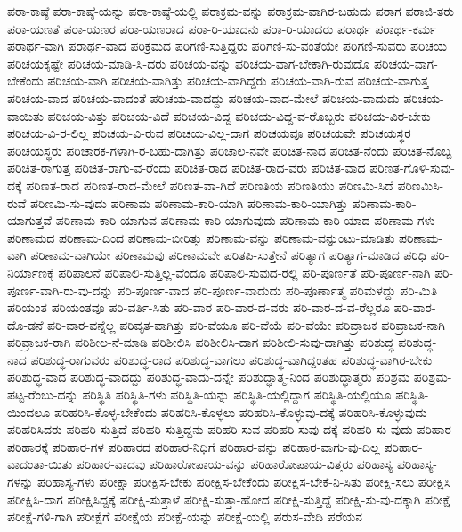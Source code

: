 {ಪರಾ-ಕಾಷ್ಠೆ
ಪರಾ-ಕಾಷ್ಠೆ-ಯನ್ನು
ಪರಾ-ಕಾಷ್ಠೆ-ಯಲ್ಲಿ
ಪರಾಕ್ರಮ-ವನ್ನು
ಪರಾಕ್ರಮ-ವಾಗಿರ-ಬಹುದು
ಪರಾಗ
ಪರಾಜಿ-ತರು
ಪರಾ-ಯಣತೆ
ಪರಾ-ಯಣರ
ಪರಾ-ಯಣರಾದ
ಪರಾ-ರಿ-ಯಾದನು
ಪರಾ-ರಿ-ಯಾದರು
ಪರಾರ್ಥ
ಪರಾರ್ಥ-ಕರ್ಮ
ಪರಾರ್ಥ-ವಾಗಿ
ಪರಾರ್ಥ-ವಾದ
ಪರಿಕ್ರಮದ
ಪರಿಗಣಿ-ಸುತ್ತಿದ್ದರು
ಪರಿಗಣಿ-ಸು-ವಂತೆಯೇ
ಪರಿಗಣಿ-ಸುವರು
ಪರಿಚಯ
ಪರಿಚಯಕ್ಕಷ್ಟೇ
ಪರಿಚಯ-ಮಾಡಿ-ಸಿ-ದರು
ಪರಿಚಯ-ವನ್ನು
ಪರಿಚಯ-ವಾಗ-ಬೇಕಾಗಿ-ರುವುದೊ
ಪರಿಚಯ-ವಾಗ-ಬೇಕೆಂದು
ಪರಿಚಯ-ವಾಗಿ
ಪರಿಚಯ-ವಾಗಿತ್ತು
ಪರಿಚಯ-ವಾಗಿದ್ದರು
ಪರಿಚಯ-ವಾಗಿ-ರುವ
ಪರಿಚಯ-ವಾಗುತ್ತ
ಪರಿಚಯ-ವಾದ
ಪರಿಚಯ-ವಾದಂತೆ
ಪರಿಚಯ-ವಾದದ್ದು
ಪರಿಚಯ-ವಾದ-ಮೇಲೆ
ಪರಿಚಯ-ವಾದುದು
ಪರಿಚಯ-ವಾಯಿತು
ಪರಿಚಯ-ವಿತ್ತು
ಪರಿಚಯ-ವಿದೆ
ಪರಿಚಯ-ವಿದ್ದ
ಪರಿಚಯ-ವಿದ್ದ-ವ-ರೊಬ್ಬರು
ಪರಿಚಯ-ವಿರ-ಬೇಕು
ಪರಿಚಯ-ವಿ-ರ-ಲಿಲ್ಲ
ಪರಿಚಯ-ವಿ-ರುವ
ಪರಿಚಯ-ವಿಲ್ಲ-ದಾಗ
ಪರಿಚಯವೂ
ಪರಿಚಯವೇ
ಪರಿಚಯಸ್ಥರ
ಪರಿಚಯಸ್ಥರು
ಪರಿಚಾರಕ-ಗಳಾಗಿ-ರ-ಬಹು-ದಾಗಿತ್ತು
ಪರಿಚಾಲ-ನವೇ
ಪರಿಚಿತ-ನಾದ
ಪರಿಚಿತ-ನೆಂದು
ಪರಿಚಿತ-ನೊಬ್ಬ
ಪರಿಚಿತ-ರಾಗುತ್ತ
ಪರಿಚಿತ-ರಾಗು-ವ-ರೆಂದು
ಪರಿಚಿತ-ರಾದ
ಪರಿಚಿತ-ರಾದ-ವರು
ಪರಿಚಿತ-ವಾದ
ಪರಿಣತ-ಗೊಳಿ-ಸುವು-ದಕ್ಕೆ
ಪರಿಣತ-ರಾದ
ಪರಿಣತ-ರಾದ-ಮೇಲೆ
ಪರಿಣತ-ವಾ-ಗಿದೆ
ಪರಿಣತಿಯ
ಪರಿಣತಿಯು
ಪರಿಣಮಿ-ಸಿದೆ
ಪರಿಣಮಿಸಿ-ರುವೆ
ಪರಿಣಮಿ-ಸು-ವುದು
ಪರಿಣಾಮ
ಪರಿಣಾಮ-ಕಾರಿ-ಯಾಗಿ
ಪರಿಣಾಮ-ಕಾರಿ-ಯಾಗಿತ್ತು
ಪರಿಣಾಮ-ಕಾರಿ-ಯಾಗುತ್ತವೆ
ಪರಿಣಾಮ-ಕಾರಿ-ಯಾಗುವ
ಪರಿಣಾಮ-ಕಾರಿ-ಯಾಗುವುದು
ಪರಿಣಾಮ-ಕಾರಿ-ಯಾದ
ಪರಿಣಾಮ-ಗಳು
ಪರಿಣಾಮದ
ಪರಿಣಾಮ-ದಿಂದ
ಪರಿಣಾಮ-ಬೀರಿತ್ತು
ಪರಿಣಾಮ-ವನ್ನು
ಪರಿಣಾಮ-ವನ್ನುಂಟು-ಮಾಡಿತು
ಪರಿಣಾಮ-ವಾಗಿ
ಪರಿಣಾಮ-ವಾಗಿಯೇ
ಪರಿಣಾಮವು
ಪರಿಣಾಮವೇ
ಪರಿತಪಿ-ಸುತ್ತೇನೆ
ಪರಿತ್ಯಾಗ
ಪರಿತ್ಯಾಗ-ಮಾಡಿದ
ಪರಿಧಿ
ಪರಿ-ನಿರ್ಯಾಣಕ್ಕೆ
ಪರಿಪಾಲನೆ
ಪರಿಪಾಲಿ-ಸುತ್ತಿಲ್ಲ-ವೆಂದೂ
ಪರಿಪಾಲಿ-ಸುವುದ-ರಲ್ಲಿ
ಪರಿ-ಪೂರ್ಣತೆ
ಪರಿ-ಪೂರ್ಣ-ನಾಗಿ
ಪರಿ-ಪೂರ್ಣ-ವಾಗಿ-ರು-ವು-ದನ್ನು
ಪರಿ-ಪೂರ್ಣ-ವಾದ
ಪರಿ-ಪೂರ್ಣ-ವಾದುದು
ಪರಿ-ಪೂರ್ಣಾತ್ಮ
ಪರಿಮಳದ್ದು
ಪರಿ-ಮಿತಿ
ಪರಿಯಂತ
ಪರಿಯಂತವೂ
ಪರಿ-ವರ್ತಿ-ಸಿತು
ಪರಿ-ವಾರ
ಪರಿ-ವಾರ-ದ-ವರು
ಪರಿ-ವಾರ-ದ-ವ-ರೆಲ್ಲರೂ
ಪರಿ-ವಾರ-ದೊ-ಡನೆ
ಪರಿ-ವಾರ-ವನ್ನೆಲ್ಲ
ಪರಿವೃತ-ವಾಗಿತ್ತು
ಪರಿ-ವೆಯೂ
ಪರಿ-ವೆಯೆ
ಪರಿ-ವೆಯೇ
ಪರಿವ್ರಾಜಕ
ಪರಿವ್ರಾಜಕ-ನಾಗಿ
ಪರಿವ್ರಾಜಕ-ರಾಗಿ
ಪರಿಶೀಲ-ನೆ-ಮಾಡಿ
ಪರಿಶೀಲಿಸಿ
ಪರಿಶೀಲಿಸಿ-ದಾಗ
ಪರಿಶೀಲಿ-ಸುವು-ದಾಗಿತ್ತು
ಪರಿಶುದ್ಧ
ಪರಿಶುದ್ಧ-ನಾದ
ಪರಿಶುದ್ಧ-ರಾಗುವರು
ಪರಿಶುದ್ಧ-ರಾದ
ಪರಿಶುದ್ಧ-ವಾಗಲು
ಪರಿಶುದ್ಧ-ವಾಗಿದ್ದಂತಹ
ಪರಿಶುದ್ಧ-ವಾಗಿರ-ಬೇಕು
ಪರಿಶುದ್ಧ-ವಾದ
ಪರಿಶುದ್ಧ-ವಾದದ್ದು
ಪರಿಶುದ್ಧ-ವಾದು-ದನ್ನೇ
ಪರಿಶುದ್ಧಾತ್ಮ-ನಿಂದ
ಪರಿಶುದ್ಧಾತ್ಮರು
ಪರಿಶ್ರಮ
ಪರಿಶ್ರಮ-ಪಟ್ಟ-ರೆಂಬು-ದನ್ನು
ಪರಿಸ್ಥಿತಿ
ಪರಿಸ್ಥಿತಿ-ಗಳು
ಪರಿಸ್ಥಿತಿ-ಯನ್ನು
ಪರಿಸ್ಥಿತಿ-ಯಲ್ಲಿದ್ದಾಗ
ಪರಿಸ್ಥಿತಿ-ಯಲ್ಲಿಯೂ
ಪರಿಸ್ಥಿತಿ-ಯಿಂದಲೂ
ಪರಿಹರಿಸಿ-ಕೊಳ್ಳ-ಬೇಕೆಂದು
ಪರಿಹರಿಸಿ-ಕೊಳ್ಳಲು
ಪರಿಹರಿಸಿ-ಕೊಳ್ಳುವು-ದಕ್ಕೆ
ಪರಿಹರಿಸಿ-ಕೊಳ್ಳುವುದು
ಪರಿಹರಿಸಿದರು
ಪರಿಹರಿ-ಸುತ್ತಿದೆ
ಪರಿಹರಿ-ಸುತ್ತಿದ್ದನು
ಪರಿಹರಿ-ಸುವ
ಪರಿಹರಿ-ಸುವು-ದಕ್ಕೆ
ಪರಿಹರಿ-ಸು-ವುದು
ಪರಿಹಾರ
ಪರಿಹಾರಕ್ಕೆ
ಪರಿಹಾರ-ಗಳ
ಪರಿಹಾರದ
ಪರಿಹಾರ-ನಿಧಿಗೆ
ಪರಿಹಾರ-ವನ್ನು
ಪರಿಹಾರ-ವಾಗು-ವು-ದಿಲ್ಲ
ಪರಿಹಾರ-ವಾದಂತಾ-ಯಿತು
ಪರಿಹಾರ-ವಾದವು
ಪರಿಹಾರೋಪಾಯ-ವನ್ನು
ಪರಿಹಾರೋಪಾಯ-ವಿತ್ತರು
ಪರಿಹಾಸ್ಯ
ಪರಿಹಾಸ್ಯ-ಗಳನ್ನು
ಪರಿಹಾಸ್ಯ-ಗಳು
ಪರೀಕ್ಷಾ
ಪರೀಕ್ಷಿಸ-ಬೇಕು
ಪರೀಕ್ಷಿಸ-ಬೇಕೆಂದು
ಪರೀಕ್ಷಿಸ-ಬೇಕೆ-ನಿ-ಸಿತು
ಪರೀಕ್ಷಿ-ಸಲು
ಪರೀಕ್ಷಿಸಿ
ಪರೀಕ್ಷಿಸಿ-ದಾಗ
ಪರೀಕ್ಷಿಸಿದ್ದಕ್ಕೆ
ಪರೀಕ್ಷಿ-ಸುತ್ತಾಳೆ
ಪರೀಕ್ಷಿ-ಸುತ್ತಾ-ಹೋದ
ಪರೀಕ್ಷಿ-ಸುತ್ತಿದ್ದೆ
ಪರೀಕ್ಷಿ-ಸು-ವು-ದಕ್ಕಾಗಿ
ಪರೀಕ್ಷೆ
ಪರೀಕ್ಷೆ-ಗಳಿ-ಗಾಗಿ
ಪರೀಕ್ಷೆಗೆ
ಪರೀಕ್ಷೆಯ
ಪರೀಕ್ಷೆ-ಯನ್ನು
ಪರೀಕ್ಷೆ-ಯಲ್ಲಿ
ಪರುಸ-ವೇದಿ
ಪರೆಯನ
}
